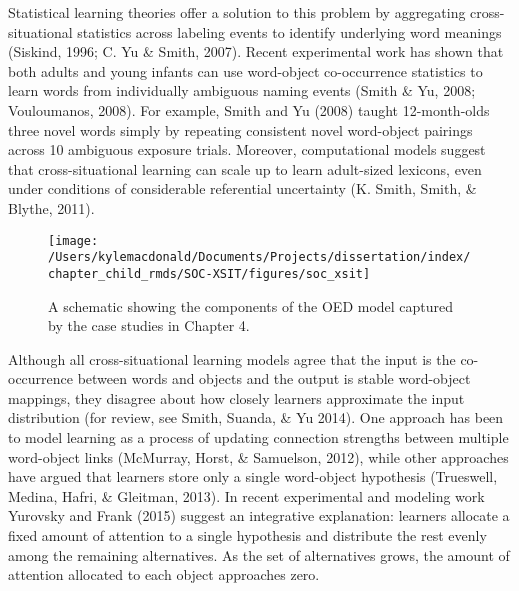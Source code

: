 \documentclass[oneside]{report}
\begin{document}
Statistical learning theories offer a solution to this problem by
aggregating cross-situational statistics across labeling events to
identify underlying word meanings (Siskind, 1996; C. Yu \& Smith, 2007).
Recent experimental work has shown that both adults and young infants
can use word-object co-occurrence statistics to learn words from
individually ambiguous naming events (Smith \& Yu, 2008; Vouloumanos,
2008). For example, Smith and Yu (2008) taught 12-month-olds three novel
words simply by repeating consistent novel word-object pairings across
10 ambiguous exposure trials. Moreover, computational models suggest
that cross-situational learning can scale up to learn adult-sized
lexicons, even under conditions of considerable referential uncertainty
(K. Smith, Smith, \& Blythe, 2011).
\begin{figure}[t]

{\centering \texttt{[image: /Users/kylemacdonald/Documents/Projects/dissertation/index/chapter\_child\_rmds/SOC-XSIT/figures/soc\_xsit]} 

}

\caption{A schematic showing the components of the OED model captured by the case studies in Chapter 4.}\label{fig:schematic-soc-xsit}
\end{figure}
Although all cross-situational learning models agree that the input is
the co-occurrence between words and objects and the output is stable
word-object mappings, they disagree about how closely learners
approximate the input distribution (for review, see Smith, Suanda, \& Yu
2014). One approach has been to model learning as a process of updating
connection strengths between multiple word-object links (McMurray,
Horst, \& Samuelson, 2012), while other approaches have argued that
learners store only a single word-object hypothesis (Trueswell, Medina,
Hafri, \& Gleitman, 2013). In recent experimental and modeling work
Yurovsky and Frank (2015) suggest an integrative explanation: learners
allocate a fixed amount of attention to a single hypothesis and
distribute the rest evenly among the remaining alternatives. As the set
of alternatives grows, the amount of attention allocated to each object
approaches zero.
\end{document}
